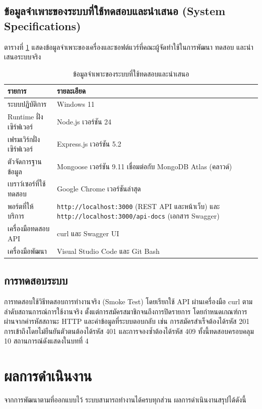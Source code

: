 \documentclass[12pt,a4paper]{report}
\begin{document}
\section{ข้อมูลจำเพาะของระบบที่ใช้ทดสอบและนำเสนอ (System Specifications)}

ตารางที่ \ref{tab:spec} แสดงข้อมูลจำเพาะของเครื่องและซอฟต์แวร์ที่คณะผู้จัดทำใช้ในการพัฒนา ทดสอบ และนำเสนอระบบจริง

\begin{table}[htbp]
\centering
\caption{ข้อมูลจำเพาะของระบบที่ใช้ทดสอบและนำเสนอ}
\label{tab:spec}
\begin{tabularx}{\textwidth}{l X}
\toprule
\textbf{รายการ} & \textbf{รายละเอียด}\\
\midrule
ระบบปฏิบัติการ & Windows 11\\
Runtime ฝั่งเซิร์ฟเวอร์ & Node.js เวอร์ชัน 24\\
เฟรมเวิร์กฝั่งเซิร์ฟเวอร์ & Express.js เวอร์ชัน 5.2\\
ตัวจัดการฐานข้อมูล & Mongoose เวอร์ชัน 9.11 เชื่อมต่อกับ MongoDB Atlas (คลาวด์)\\
เบราว์เซอร์ที่ใช้ทดสอบ & Google Chrome เวอร์ชันล่าสุด\\
พอร์ตที่ให้บริการ & \texttt{http://localhost:3000} (REST API และหน้าเว็บ) และ \texttt{http://localhost:3000/api-docs} (เอกสาร Swagger)\\
เครื่องมือทดสอบ API & curl และ Swagger UI\\
เครื่องมือพัฒนา & Visual Studio Code และ Git Bash\\
\bottomrule
\end{tabularx}
\end{table}

\section{การทดสอบระบบ}

การทดสอบใช้วิธีทดสอบการทำงานจริง (Smoke Test) โดยเรียกใช้ API ผ่านเครื่องมือ curl ตามลำดับสถานการณ์การใช้งานจริง ตั้งแต่การสมัครสมาชิกจนถึงการปิดรายการ โดยกำหนดเกณฑ์การผ่านจากค่ารหัสสถานะ HTTP และค่าข้อมูลที่ระบบตอบกลับ เช่น การสมัครสำเร็จต้องได้รหัส 201 การเข้าถึงโดยไม่ยืนยันตัวตนต้องได้รหัส 401 และการจองซ้ำต้องได้รหัส 409 ทั้งนี้ทดสอบครอบคลุม 10 สถานการณ์ดังแสดงในบทที่ 4

\chapter{ผลการดำเนินงาน}

จากการพัฒนาตามที่ออกแบบไว้ ระบบสามารถทำงานได้ครบทุกส่วน ผลการดำเนินงานสรุปได้ดังนี้
\end{document}
